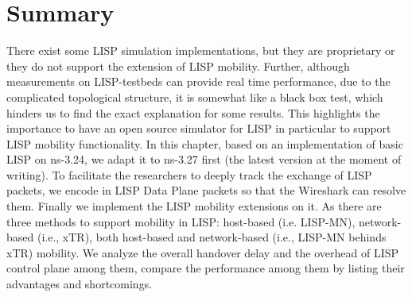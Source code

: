 
\section{Summary}
\label{sec:ns3_conclusion}
There exist some LISP simulation implementations, but they are proprietary or they do not support the extension of LISP mobility. Further, although measurements on LISP-testbeds can provide real time performance, due to the complicated topological structure, it is somewhat like a black box test, which hinders us to find the exact explanation for some results. This highlights the importance to have an open source simulator for LISP in particular to support LISP mobility functionality. In this chapter, based on an implementation of basic LISP on ns-3.24, we adapt it to ns-3.27 first (the latest version at the moment of writing). To facilitate the researchers to deeply track the exchange of LISP packets, we encode in LISP Data Plane packets so that the Wireshark can resolve them. Finally we implement the LISP mobility extensions on it. As there are three methods to support mobility in LISP: host-based (i.e. LISP-MN), network-based (i.e., xTR), both host-based and network-based (i.e., LISP-MN behinds xTR) mobility. We analyze the overall handover delay and the overhead of LISP control plane among them, compare the performance among them by listing their advantages and shortcomings. %


